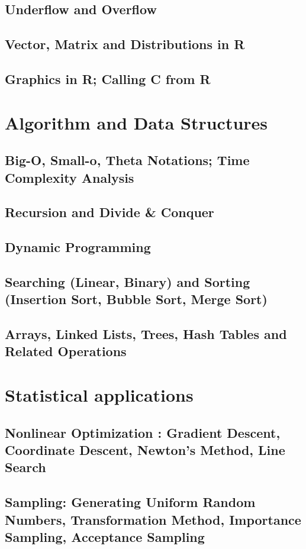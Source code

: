 \documentclass{report}
\begin{document}
\section{Underflow and Overflow}
\section{Vector, Matrix and Distributions in R}
\section{Graphics in R; Calling C from R}

\chapter{Algorithm and Data Structures}
\section{Big-O, Small-o, Theta Notations; Time Complexity Analysis}
\section{Recursion and Divide \& Conquer}
\section{Dynamic Programming}
\section{Searching (Linear, Binary) and Sorting (Insertion Sort, Bubble Sort, Merge Sort)}
\section{Arrays, Linked Lists, Trees, Hash Tables and Related Operations}

\chapter{Statistical applications}
\section{Nonlinear Optimization : Gradient Descent, Coordinate Descent, Newton's Method, Line Search}
\section{Sampling: Generating Uniform Random Numbers, Transformation Method, Importance Sampling, Acceptance Sampling}
\end{document}
